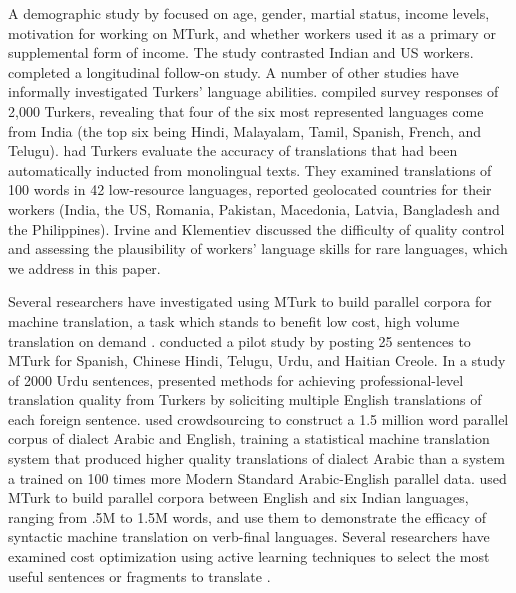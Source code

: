 \documentclass[11pt]{article}
\begin{document}
A demographic study by  focused on age, gender, martial status, income levels, motivation for working on MTurk, and whether workers used it as a primary or supplemental form of income.  The study contrasted Indian and US workers.  completed a longitudinal follow-on study. 
A number of other studies have informally investigated Turkers' language abilities.   compiled survey responses of 2,000 Turkers, revealing that four of the six most represented languages come from India (the top six being Hindi, Malayalam, Tamil, Spanish, French, and Telugu).   had Turkers evaluate the accuracy of translations that had been automatically inducted from monolingual texts.  They examined translations of 100 words in 42 low-resource languages, reported geolocated countries for their workers (India, the US, Romania, Pakistan, Macedonia, Latvia, Bangladesh and the Philippines).  Irvine and Klementiev discussed the difficulty of quality control and assessing the plausibility of workers' language skills for rare languages, which we address in this paper. 

Several researchers have investigated using MTurk to build parallel corpora for machine translation, a task which stands to benefit low cost, high volume  translation on demand \cite{Germann2001}.   conducted a pilot study by posting 25 sentences to MTurk for Spanish, Chinese Hindi, Telugu, Urdu, and Haitian Creole.  In a study of 2000 Urdu sentences, 
 presented methods for achieving professional-level translation quality from Turkers by soliciting multiple English translations of each foreign sentence. 
 used crowdsourcing to construct a 1.5 million word parallel corpus of dialect Arabic and English, training a statistical machine translation system that produced higher quality translations of dialect Arabic than a system a trained on 100 times more Modern Standard Arabic-English parallel data.   used MTurk to build parallel corpora between English and six Indian languages, ranging from .5M to 1.5M words, and use them to demonstrate the efficacy of syntactic machine translation on verb-final languages.  
Several researchers have examined cost optimization using active learning techniques to select the most useful sentences or fragments to translate \cite{ambati_naacl,bloodgood-callisonburch:2010:ACL,AmbatiThesis}.
\end{document}
